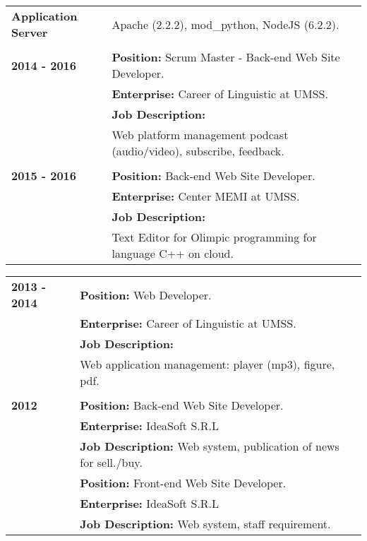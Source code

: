 \documentclass[letterpaper,11pt,oneside]{article}
\begin{document}
\begin{tabular}{l l l}
	\textbf{Application Server} & Apache (2.2.2), mod\_python, NodeJS (6.2.2). \\
	\\
	\textbf{2014 - 2016}		& \textbf{Position:} Scrum Master - Back-end Web Site Developer. \\
								& \textbf{Enterprise:} Career of Linguistic at UMSS. \\
								& \textbf{Job Description:} \\
								& Web platform management podcast (audio/video), subscribe, feedback. \\
	\\
	\textbf{2015 - 2016}		& \textbf{Position:} Back-end Web Site Developer. \\
								& \textbf{Enterprise:} Center MEMI at UMSS. \\
								& \textbf{Job Description:} \\
								& Text Editor for Olimpic programming for language C++ on cloud.\\ 
\end{tabular}
								
\noindent \begin{tabular}{@{} l l}
	\textbf{2013 - 2014}	& \hspace{1in} \textbf{Position:} Web Developer. \\
							& \hspace{1in} \textbf{Enterprise:} Career of Linguistic at UMSS. \\
							& \hspace{1in} \textbf{Job Description:} \\
							& \hspace{1in} Web application management: player (mp3), figure, pdf. \\  				 
	\\
	\textbf{2012}			& \hspace{1in} \textbf{Position:} Back-end Web Site Developer. \\
							& \hspace{1in} \textbf{Enterprise:} IdeaSoft S.R.L \\
							& \hspace{1in} \textbf{Job Description:} Web system, publication of news for sell./buy.\\
					 		& \hspace{1in} \textbf{Position:} Front-end Web Site Developer.\\
					 		& \hspace{1in} \textbf{Enterprise:} IdeaSoft S.R.L \\			
					 		& \hspace{1in} \textbf{Job Description:} Web system, staff requirement. \\
\end{tabular}
\end{document}
